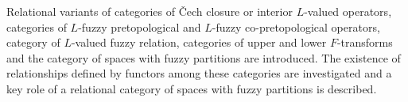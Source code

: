 
	Relational variants of categories of \v Cech closure or interior $L$-valued operators, categories of $L$-fuzzy pretopological and $L$-fuzzy co-pretopological operators, category of $L$-valued fuzzy relation, categories of upper and lower $F$-transforms and the category of spaces with fuzzy partitions are introduced. The existence of relationships defined by functors among these categories are investigated and a key role of a relational category of spaces with fuzzy partitions is described.

